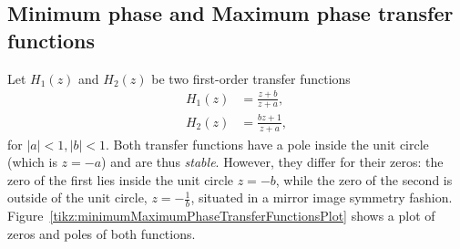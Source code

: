 \documentclass[\documentfontsize, twocolumn]{\classname}
\begin{document}
\subsection{Minimum phase and Maximum phase transfer functions}

Let $H_1(z)$ and $H_2(z)$ be two first-order transfer functions
\begin{align*}
    H_1(z) &= \frac{z+b}{z+a},\\
    H_2(z) &= \frac{bz+1}{z+a},
\end{align*}
for $|a|<1, |b| < 1$. Both transfer functions have a pole inside the unit circle (which is $z=-a$) and are thus \emph{stable}. However, they differ for their zeros: the zero of the first lies inside the unit circle $z=-b$, while the zero of the second is outside of the unit circle, $z=-\frac 1 b$, situated in a mirror image symmetry fashion. Figure~\ref{tikz:minimumMaximumPhaseTransferFunctionsPlot} shows a plot of zeros and poles of both functions.

\begin{figure*}
\begin{center}
\end{center}\caption{Zero-poles plot of transfer functions $H_1(z)$ and $H_2(z)$. Zero at $z = -\frac 1 b$ is the mirror-image zero of $z=-b$.}\label{tikz:minimumMaximumPhaseTransferFunctionsPlot}
\end{figure*}
\end{document}
